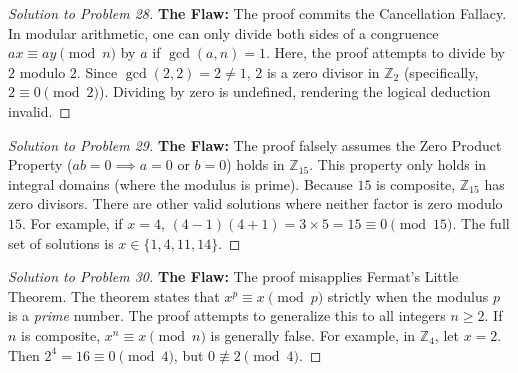 \documentclass[11pt, a4paper]{article}
\theoremstyle{definition}
\theoremstyle{remark}
\newcommand{\Z}{\mathbb{Z}}
\begin{document}
\begin{proof}[Solution to Problem 28]
\textbf{The Flaw:} The proof commits the Cancellation Fallacy. In modular arithmetic, one can only divide both sides of a congruence $ax \equiv ay \pmod n$ by $a$ if $\gcd(a,n) = 1$. Here, the proof attempts to divide by $2$ modulo $2$. Since $\gcd(2,2) = 2 \neq 1$, $2$ is a zero divisor in $\Z_2$ (specifically, $2 \equiv 0 \pmod 2$). Dividing by zero is undefined, rendering the logical deduction invalid.
\end{proof}

\begin{proof}[Solution to Problem 29]
\textbf{The Flaw:} The proof falsely assumes the Zero Product Property ($ab = 0 \implies a=0$ or $b=0$) holds in $\Z_{15}$. This property only holds in integral domains (where the modulus is prime). Because $15$ is composite, $\Z_{15}$ has zero divisors. There are other valid solutions where neither factor is zero modulo $15$. For example, if $x=4$, $(4-1)(4+1) = 3 \times 5 = 15 \equiv 0 \pmod{15}$. The full set of solutions is $x \in \{1, 4, 11, 14\}$.
\end{proof}

\begin{proof}[Solution to Problem 30]
\textbf{The Flaw:} The proof misapplies Fermat's Little Theorem. The theorem states that $x^p \equiv x \pmod p$ strictly when the modulus $p$ is a \textit{prime} number. The proof attempts to generalize this to all integers $n \ge 2$. If $n$ is composite, $x^n \equiv x \pmod n$ is generally false. For example, in $\Z_4$, let $x=2$. Then $2^4 = 16 \equiv 0 \pmod 4$, but $0 \not\equiv 2 \pmod 4$.
\end{proof}

\newpage
\end{document}
